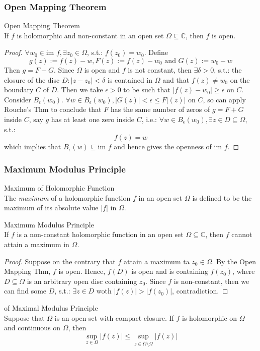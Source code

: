 \subsubsection{Open Mapping Theorem}

\begin{theorem}{Open Mapping Theorem}\\
If $f$ is holomorphic and non-constant in an open set $\Omega \subseteq \mathbb C$, then $f$ is open.
\end{theorem}

\begin{proof}
    $\forall w_0 \in \text{im }f, \exists z _0\in \Omega$, s.t.: $f(z_0)=w_0$. Define 
    $$g(z) := f(z)-w, F(z):= f(z)-w_0 \text{ and } G(z):= w_0-w$$
    Then $g=F+G$. Since $\Omega$ is open and $f$ is not constant, then $\exists \delta>0$, s.t.: the closure of the disc $D: |z-z_0|<\delta$ is contained in $\Omega$ and that $f(z) \neq w_0$ on the boundary $C$ of $D$. Then we take $\epsilon>0$ to be such that $|f(z)-w_0|\geq \epsilon$ on $C$. Consider $B_\epsilon (w_0)$. $\forall w\in B_\epsilon (w_0), |G(z)|< \epsilon \leq F|(z)|$ on $C$, so can apply Rouche's Thm to conclude that $F$ has the same number of zeros of $g=F+G$ inside $C$, say $g$ has at least one zero inside $C$, i.e.: $\forall w\in B_\epsilon (w_0), \exists z\in D\subseteq \Omega$, s.t.:
    \[
    f(z)=w
    \]
    which implies that $B_\epsilon (w) \subseteq \text{im }f$ and hence gives the openness of $\text{im }f$.
\end{proof}

\subsubsection{Maximum Modulus Principle}

\begin{definition}{Maximum of Holomorphic Function}\\
The \textit{maximum} of a holomorphic function $f$ in an open set $\Omega$ is defined to be the maximum of its absolute value $|f|$ in $\Omega$.
\end{definition}

\begin{theorem}{Maximum Modulus Principle}\\
If $f$ is a non-constant holomorphic function in an open set $\Omega  \subseteq \mathbb{C}$, then $f$ cannot attain a maximum in $\Omega$.
\end{theorem}

\begin{proof}
    Suppose on the contrary that $f$ attain a maximum ta $z_0 \in \Omega$. By the Open Mapping Thm, $f$ is open. Hence, $f(D)$ is open and is containing $f(z_0)$, where $D\subseteq \Omega$ is an arbitrary open disc containing $z_0$. Since $f$ is non-constant, then we can find some $D$, s.t.: $\exists z\in D$ woth $|f(z)|> |f(z_0)|$, contradiction.
\end{proof}

\begin{corollary}{of Maximal Modulus Principle}\\
Suppose that $\Omega$ is an open set with compact closure. If $f$ is holomorphic on $\Omega$ and continuous on $\overline{\Omega}$, then
\[
\sup_{z\in \Omega} |f(z)| \leq \sup_{z\in \overline{\Omega} \setminus \Omega} |f(z)|
\]
\end{corollary}


